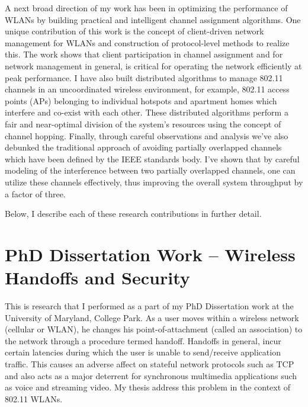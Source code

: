 \documentclass[11pt,letterpaper]{article}
\begin{document}
 A next broad direction of my work has been in optimizing the performance of WLANs by building practical and
intelligent channel assignment algorithms. One unique contribution of this work is the concept of client-driven network
management for WLANs and construction of protocol-level methods to realize this. The work shows that client participation in
channel assignment and for network management in general, is critical for operating the network efficiently at peak
performance. I have also built distributed algorithms to manage 802.11 channels in an uncoordinated wireless
environment, for example, 802.11 access points (APs) belonging to individual hotspots and apartment homes  which interfere and co-exist with
each other. These distributed algorithms perform a fair and near-optimal division of the system's resources using the concept of
channel hopping.  Finally, through careful observations and analysis we've also debunked the traditional approach of
avoiding partially overlapped channels which have been defined by the IEEE standards body.  I've shown that by careful modeling of the interference between two partially
overlapped channels, one can utilize these channels effectively, thus improving the overall system throughput by a
factor of three.

Below, I describe each of these research contributions in further detail.


\section*{PhD Dissertation Work -- Wireless Handoffs and Security}
This is research that I performed as a part of my PhD Dissertation work at the University of Maryland, College Park.
As a user moves within a wireless
network (cellular or WLAN), he changes his point-of-attachment (called an association) to the network through a
procedure termed handoff. Handoffs in general, incur certain latencies during which the user is unable to send/receive
application traffic. This causes an adverse affect on stateful network protocols such as TCP and also acts as a major
deterrent for synchronous multimedia applications such as voice and streaming video. My thesis address this problem in
the context of 802.11 WLANs.  
\end{document}
